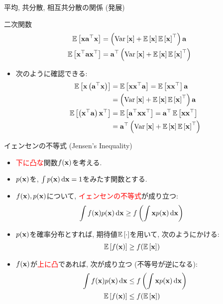 \documentclass[dvipdfmx,notheorems,t]{beamer}
\begin{document}
\begin{frame}{平均, 共分散, 相互共分散の関係 (発展)}
\begin{block}{二次関数}
  \begin{align*}
    \E{\vb{x} \vb{a}^\top \vb{x}} &= \left( \Var{\vb{x}} + \E{\vb{x}} \E{\vb{x}}^\top \right) \vb{a} \\
    \E{\vb{x}^\top \vb{a} \vb{x}^\top} &= \vb{a}^\top \left( \Var{\vb{x}} + \E{\vb{x}} \E{\vb{x}}^\top \right)
  \end{align*}
\end{block}

\begin{itemize}
  \item 次のように確認できる:
  \begin{align*}
    \E{\vb{x} \left( \vb{a}^\top \vb{x} \right)} &= \E{\vb{x} \vb{x}^\top \vb{a}}
      = \E{\vb{x} \vb{x}^\top} \vb{a} \\
      &= \left( \Var{\vb{x}} + \E{\vb{x}} \E{\vb{x}}^\top \right) \vb{a} \\
    \E{\left( \vb{x}^\top \vb{a} \right) \vb{x}^\top} &= \E{\vb{a}^\top \vb{x} \vb{x}^\top}
      = \vb{a}^\top \E{\vb{x} \vb{x}^\top} \\
      &= \vb{a}^\top \left( \Var{\vb{x}} + \E{\vb{x}} \E{\vb{x}}^\top \right)
  \end{align*}
\end{itemize}
\end{frame}

\begin{frame}{イェンセンの不等式 (Jensen's Inequality)}
\begin{itemize}
  \item \textcolor{red}{下に凸な}関数$f(\vb{x})$を考える.
  \item $p(\vb{x})$を, $\int p(\vb{x}) \dd{\vb{x}} = 1$をみたす関数とする.
  \item $f(\vb{x}), p(\vb{x})$について, \textcolor{red}{イェンセンの不等式}が成り立つ:
  \begin{align*}
    \int f(\vb{x}) p(\vb{x}) \dd{\vb{x}} &\ge f \left( \int \vb{x} p(\vb{x}) \dd{\vb{x}} \right)
  \end{align*}
  \item $p(\vb{x})$を確率分布とすれば, 期待値$\E{\cdot}$を用いて, 次のようにかける:
  \begin{align*}
    \E{f(\vb{x})} &\ge f(\E{\vb{x}})
  \end{align*}
  \item $f(\vb{x})$が\textcolor{red}{上に凸}であれば, 次が成り立つ (不等号が逆になる):
  \begin{align*}
    \int f(\vb{x}) p(\vb{x}) \dd{\vb{x}} &\le f \left( \int \vb{x} p(\vb{x}) \dd{\vb{x}} \right) \\
    \E{f(\vb{x})} &\le f(\E{\vb{x}})
  \end{align*}
\end{itemize}
\end{frame}
\end{document}
